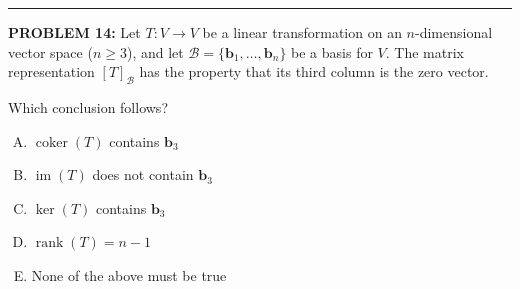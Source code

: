 \documentclass[12pt]{amsart}
\newcommand{\divider}{
  \vspace{-1em} %
  \noindent
  \raisebox{-0.15ex}{\textbullet}%
  \hspace{0.5em}%
  \rule[0.5ex]{0.95\textwidth}{1.0pt}%
  \hspace{0.5em}%
  \raisebox{-0.15ex}{\textbullet}%
  \vspace{0em} %
}
\begin{document}
%
\divider



\newpage



{\bf PROBLEM 14:}
%
Let $T: V \to V$ be a linear transformation on an $n$-dimensional vector space ($n \geq 3$), and let $\mathcal{B} = \{\mathbf{b}_1, \ldots, \mathbf{b}_n\}$ be a basis for $V$. The matrix representation $[T]_\mathcal{B}$ has the property that its third column is the zero vector.

Which conclusion follows?

\begin{enumerate}[(A)]
\item $\operatorname{coker}(T)$ contains $\mathbf{b}_3$
\item $\operatorname{im}(T)$ does not contain $\mathbf{b}_3$
\item $\ker(T)$ contains $\mathbf{b}_3$
\item $\operatorname{rank}(T) = n - 1$
\item None of the above must be true
\end{enumerate}
\end{document}
